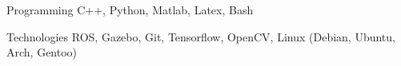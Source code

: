 
\begin{cvskills}

  \cvskill
    {Programming} %
    {C++, Python, Matlab, Latex, Bash} %

  \cvskill
    {Technologies} %
    {ROS, Gazebo, Git, Tensorflow, OpenCV, Linux (Debian, Ubuntu, Arch, Gentoo)} %


\end{cvskills}
